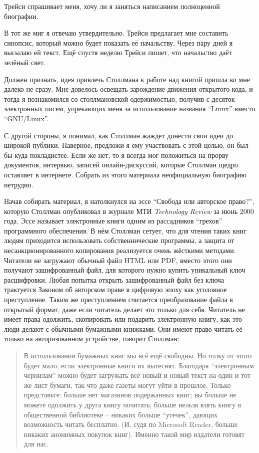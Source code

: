 Трейси спрашивает меня, хочу ли я заняться написанием полноценной биографии.

В тот же миг я отвечаю утвердительно. Трейси предлагает мне составить синопсис, который можно будет показать её начальству. Через пару дней я высылаю ей текст. Ещё спустя неделю Трейси пишет, что начальство даёт зелёный свет.

Должен признать, идея привлечь Столлмана к работе над книгой пришла ко мне далеко не сразу. Мне довелось освещать зарождение движения открытого кода, и тогда я познакомился со столлмановской одержимостью, получив с десяток электронных писем, упрекающих меня за использование названия \enquote{Linux} вместо \enquote{GNU/Linux}.

С другой стороны, я понимал, как Столлман жаждет донести свои идеи до широкой публики. Наверное, предложи я ему участвовать с этой целью, он был бы куда покладистее. Если же нет, то я всегда мог положиться на прорву документов, интервью, записей онлайн-дискуссий, которые Столлман щедро оставляет в интернете. Собрать из этого материала неофициальную биографию нетрудно.

Начав собирать материал, я натолкнулся на эссе \enquote{Свобода или авторское право?}, которую Столлман опубликовал в журнале МТИ \textit{Technology Review} за июнь 2000 года. Эссе называет электронные книги одним из рассадников \enquote{грехов} программного обеспечения. В нём Столлман сетует, что для чтения таких книг людям приходится использовать собственнические программы, а защита от несанкционированного копирования реализуется очень жёсткими методами. Читатели не загружают обычный файл HTML или PDF, вместо этого они получают зашифрованный файл, для которого нужно купить уникальный ключ расшифровки. Любая попытка открыть зашифрованный файл без ключа трактуется Законом об авторском праве в цифровую эпоху как уголовное преступление. Таким же преступлением считается преобразование файла в открытый формат, даже если читатель делает это только для себя. Читатель не имеет права одолжить, скопировать или подарить электронную книгу, как это люди делают с обычными бумажными книжками. Они имеют право читать её только на авторизованном устройстве, говорит Столлман:

\begin{quote}
В использовании бумажных книг мы всё ещё свободны. Но толку от этого будет мало, если электронные книги их вытеснят. Благодаря \enquote{электронным чернилам} можно будет загружать всё новый и новый текст на один и тот же лист бумаги, так что даже газеты могут уйти в прошлое. Только представьте: больше нет магазинов подержанных книг; вы больше не можете одолжить у друга книгу почитать; больше нельзя взять книгу в общественной библиотеке -- никаких больше \enquote{утечек}, дающих возможность читать бесплатно. (И, судя по Microsoft Reader, больше никаких анонимных покупок книг). Именно такой мир издатели готовят для нас. 
\end{quote}

